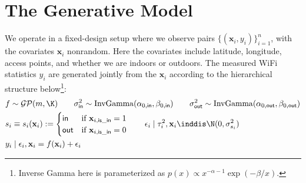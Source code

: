 \documentclass{article}
\newcommand{\bl}{\mathbf}
\begin{document}
\setcounter{section}{-1}
\section{The Generative Model}\label{sec:gen-model}

We operate in a fixed-design setup where we observe pairs $\{(\bl{x}_i, y_i)\}_{i = 1} ^n$, with the covariates $\bl{x}_i$ nonrandom. Here the covariates include latitude, longitude, access points, and whether we are indoors or outdoors. The measured WiFi statistics $y_i$ are generated jointly from the $\bl{x}_i$ according to the hierarchical structure below\footnote{Inverse Gamma here is parameterized as $p(x) \propto x^{-\alpha - 1}\exp(-\beta/x)$.}:
\begin{align*}
    &f \sim \mathcal{GP}(m, \K) \qquad \sigma_\mathsf{in}^2 \sim \mathrm{InvGamma}(\alpha_{0,\mathsf{in}}, \beta_{0,\mathsf{in}}) \qquad \sigma_\mathsf{out}^2 \sim \mathrm{InvGamma}(\alpha_{0,\mathsf{out}}, \beta_{0,\mathsf{out}}) \\
    &s_i \equiv s_i(\bl{x}_i) := \begin{cases}
    \mathsf{in} &\text{if } \mathbf{x}_{i,\mathsf{is\_in}} = 1 \\
    \mathsf{out} &\text{if } \mathbf{x}_{i,\mathsf{is\_in}} = 0 \\
    \end{cases} \qquad \epsilon_i \mid \tau_i^2, \bl{x}_i \inddis \N(0, \sigma_{s_i}^2) \\
    &y_i \mid \epsilon_i, \bl{x}_i = f(\bl{x}_i) + \epsilon_i
\end{align*}
\end{document}
